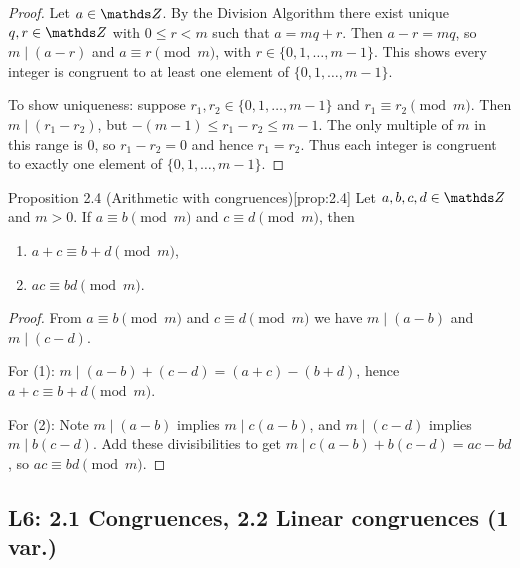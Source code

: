 \documentclass[10pt]{article}
\theoremstyle{definition}
\theoremstyle{plain}
\numberwithin{equation}{section}
\begin{document}
\begin{proof}
Let $a\in\setZ$. By the Division Algorithm there exist unique $q,r\in\setZ$
with $0\le r<m$ such that $a=mq+r$. Then $a-r=mq$, so $m\mid(a-r)$ and $a\equiv r\pmod{m}$,
with $r\in\{0,1,\dots,m-1\}$. This shows every integer is congruent to at least one element
of $\{0,1,\dots,m-1\}$.

To show uniqueness: suppose $r_1,r_2\in\{0,1,\dots,m-1\}$ and $r_1\equiv r_2\pmod{m}$.
Then $m\mid(r_1-r_2)$, but $-(m-1)\le r_1-r_2\le m-1$. The only multiple of $m$ in this range
is $0$, so $r_1-r_2=0$ and hence $r_1=r_2$. Thus each integer is congruent to exactly one
element of $\{0,1,\dots,m-1\}$.
\end{proof}

\begin{define}{Proposition 2.4 (Arithmetic with congruences)}[prop:2.4]
Let $a,b,c,d\in\setZ$ and $m>0$. If $a\equiv b\pmod{m}$ and $c\equiv d\pmod{m}$, then
\begin{enumerate}
  \item $a+c\equiv b+d\pmod{m}$,
  \item $ac\equiv bd\pmod{m}$.
\end{enumerate}
\end{define}

\begin{proof}
From $a\equiv b\pmod{m}$ and $c\equiv d\pmod{m}$ we have $m\mid(a-b)$ and $m\mid(c-d)$.

For (1): $m\mid (a-b)+(c-d)=(a+c)-(b+d)$, hence $a+c\equiv b+d\pmod{m}$.

For (2): Note $m\mid(a-b)$ implies $m\mid c(a-b)$, and $m\mid(c-d)$ implies $m\mid b(c-d)$.
Add these divisibilities to get $m\mid c(a-b)+b(c-d)=ac-bd$, so $ac\equiv bd\pmod{m}$.
\end{proof}














\newpage
\subsection{L6: 2.1 Congruences, 2.2 Linear congruences (1 var.)}

\end{document}
